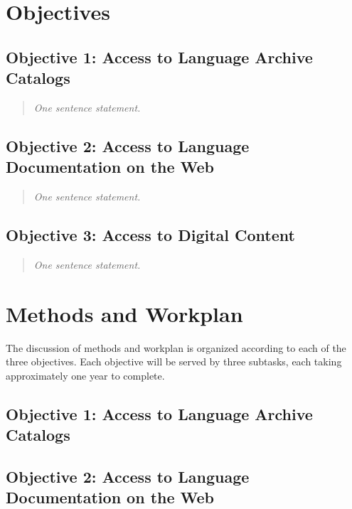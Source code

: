 \section{Objectives}

\subsection*{Objective 1: Access to Language Archive Catalogs}

\begin{quote}
{\it
  One sentence statement.
}
\end{quote}

\subsection*{Objective 2: Access to Language Documentation on the Web}

\begin{quote}
{\it
  One sentence statement.
}
\end{quote}

\subsection*{Objective 3: Access to Digital Content}

\begin{quote}
{\it
  One sentence statement.
}
\end{quote}

\section{Methods and Workplan}

The discussion of methods and workplan is organized according to
each of the three objectives.  Each objective will be served by
three subtasks, each taking approximately one year to complete.


\subsection*{Objective 1: Access to Language Archive Catalogs}

\vspace{1in}

\subsection*{Objective 2: Access to Language Documentation on the Web}

